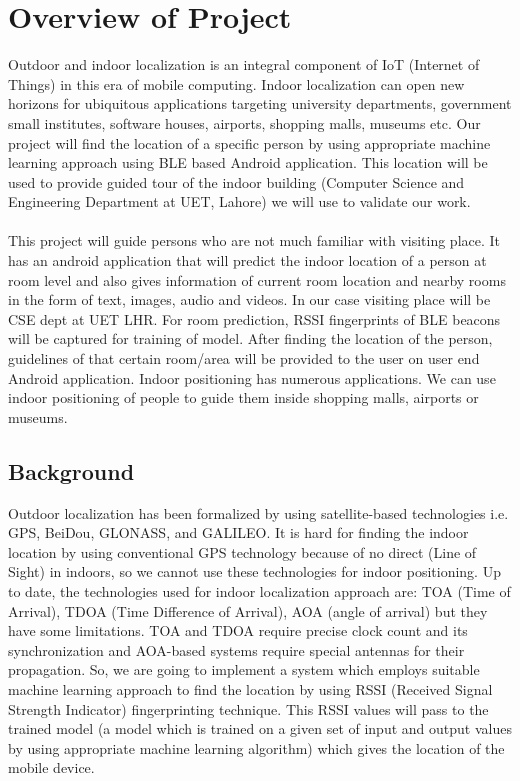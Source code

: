 \documentclass{article}
\begin{document}
\section{Overview of Project}
Outdoor and indoor localization is an integral component of  IoT (Internet of Things) in this era of mobile computing. Indoor localization can open new horizons for ubiquitous applications targeting university departments, government small institutes, software houses, airports, shopping malls, museums etc. Our project will find the location of a specific person by using appropriate machine learning approach using BLE based Android application. This location will be used to provide guided tour of the indoor building (Computer Science and Engineering Department at UET, Lahore) we will use to validate our work. 
\\\\
This project will guide persons who are not much familiar with visiting place. It has an android application that will predict the indoor location of a person at room level and also gives information of current room location and nearby rooms in the form of text, images, audio and videos. In our case visiting place will be CSE dept at UET LHR. For room prediction, RSSI fingerprints of BLE beacons will be captured for training of model. After finding the location of the person, guidelines of that certain room/area will be provided to the user on user end Android application. Indoor positioning has numerous applications. We can use indoor positioning of people to guide them inside shopping malls, airports or museums. 


\subsection{Background}
Outdoor localization has been formalized by using satellite-based technologies i.e. GPS\cite{GPS}, BeiDou\cite{cooper2016loco}, GLONASS\cite{cooper2016loco}, and GALILEO\cite{GALILEO}. It is hard for finding the indoor location by using conventional GPS technology because of no direct (Line of Sight)\cite{akram2018censloc} in indoors, so we cannot use these technologies for indoor positioning. Up to date, the technologies used for indoor localization approach are: TOA (Time of Arrival), TDOA (Time Difference of Arrival), AOA (angle of arrival) but they have some limitations. TOA and TDOA require precise clock count and its synchronization and AOA-based systems require special antennas for their propagation. So, we are going to implement a system which employs suitable machine learning approach to find the location by using RSSI (Received Signal Strength Indicator) fingerprinting technique. This RSSI values will pass to the trained model (a model which is trained on a given set of input and output values by using appropriate machine learning algorithm) which gives the location of the mobile device.
\end{document}
